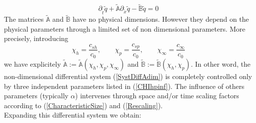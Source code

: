 \documentclass[
10pt, %
a4paper, %
oneside, %
headinclude,footinclude, %
table
]{scrartcl}
\begin{document}
\begin{equation}\label{SystDiffAdim}
\boxed{\partial_{\tilde{t}}\tilde{q}+\tilde{\mathbb{A}}\partial_{\tilde{x}}\tilde{q}-\tilde{\mathbb{B}}\tilde{q}=0}
\end{equation}
The matrices $\tilde{\mathbb{A}}$ and $\tilde{\mathbb{B}}$ have no physical dimensions. However they depend on the physical parameters through a limited set of non dimensional parameters. More precisely, introducing
\begin{equation}\label{CHIhpinf}
\chi_{h}=\frac{c_{sh}}{c_{0}}, \quad\quad
\chi_{p}=\frac{c_{sp}}{c_{0}}, \quad\quad
\chi_{\infty}=\frac{c_{\infty}}{c_{0}}
\end{equation}
we have explicitely $\tilde{\mathbb{A}}:=\tilde{\mathbb{A}}(\chi_{h},\chi_{p},\chi_{\infty})$ and $\tilde{\mathbb{B}}:=\tilde{\mathbb{B}}(\chi_{h},\chi_{p})$. In other word, the non-dimensional differential system (\ref{SystDiffAdim}) is completely controlled only by three independent parameters listed in (\ref{CHIhpinf}). The influence of others parameters (typically $\alpha$) intervenes through space and/or time scaling factors according to (\ref{CharacteristicSize}) and (\ref{Rescaling}). \\
Expanding this differential system we obtain:
\end{document}

